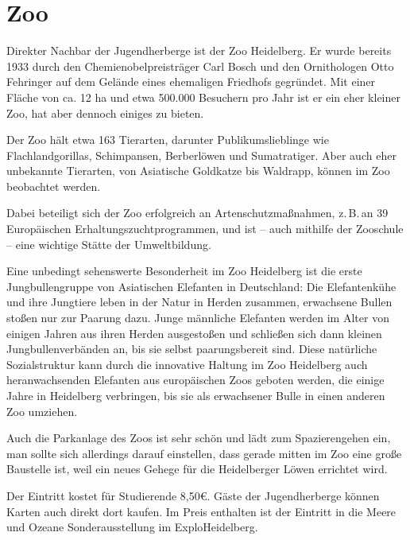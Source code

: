 
\section*{Zoo}
Direkter Nachbar der Jugendherberge ist der Zoo Heidelberg. Er wurde bereits 1933 durch den Chemienobelpreisträger Carl Bosch und den Ornithologen Otto Fehringer auf dem Gelände eines ehemaligen Friedhofs gegründet. Mit einer Fläche von ca. 12 ha und etwa 500.000 Besuchern pro Jahr ist er ein eher kleiner Zoo, hat aber dennoch einiges zu bieten.

Der Zoo hält etwa 163 Tierarten, darunter Publikumslieblinge wie Flachlandgorillas, Schimpansen, Berberlöwen und Sumatratiger. Aber auch eher unbekannte Tierarten, von Asiatische Goldkatze bis Waldrapp, können im Zoo beobachtet werden.

Dabei beteiligt sich der Zoo erfolgreich an Artenschutzmaßnahmen, z.\,B.\,an 39 Europäischen Erhaltungszuchtprogrammen, und ist -- auch mithilfe der Zooschule -- eine wichtige Stätte der Umweltbildung.

Eine unbedingt sehenswerte Besonderheit im Zoo Heidelberg ist die erste Jungbullengruppe von Asiatischen Elefanten in Deutschland: Die Elefantenkühe und ihre Jungtiere leben in der Natur in Herden zusammen, erwachsene Bullen stoßen nur zur Paarung dazu. Junge männliche Elefanten werden im Alter von einigen Jahren aus ihren Herden ausgestoßen und schließen sich dann kleinen Jungbullenverbänden an, bis sie selbst paarungsbereit sind. Diese natürliche Sozialstruktur kann durch die innovative Haltung im Zoo Heidelberg auch heranwachsenden Elefanten aus europäischen Zoos geboten werden, die einige Jahre in Heidelberg verbringen, bis sie als erwachsener Bulle in einen anderen Zoo umziehen. 

Auch die Parkanlage des Zoos ist sehr schön und lädt zum Spazierengehen ein, man sollte sich allerdings darauf einstellen, dass gerade mitten im Zoo eine große Baustelle ist, weil ein neues Gehege für die Heidelberger Löwen errichtet wird.

Der Eintritt kostet für Studierende 8,50€. Gäste der Jugendherberge können Karten auch direkt dort kaufen. Im Preis enthalten ist der Eintritt in die \glqq Meere und Ozeane\grqq{}  Sonderausstellung im ExploHeidelberg.
